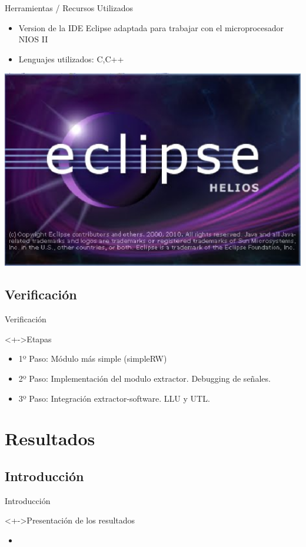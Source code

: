 \documentclass[xcolor=dvipsnames]{beamer}
\begin{document}
\begin{frame}{Herramientas / Recursos Utilizados}
\begin{block}
    \begin{itemize}
      \scriptsize
     	\item Version de la IDE Eclipse adaptada para trabajar con el microprocesador NIOS II
	\item Lenguajes utilizados: C,C++
    \end{itemize}
	\center	
	\includegraphics[scale=0.10]{figures/eclipse.eps}  	
  \end{block}
\end{frame}

\subsection{Verificación}
\begin{frame}{Verificación}
\begin{block}<+->{Etapas}   
    \begin{itemize}
      \scriptsize
     	\item 1º Paso: Módulo más simple (simpleRW)
     	\item 2º Paso: Implementación del modulo extractor. Debugging de señales.
     	\item 3º Paso: Integración extractor-software. LLU y UTL.
    \end{itemize}
  \end{block}
\end{frame}

\section{Resultados}
\subsection{Introducción}
\begin{frame}{Introducción}
  \begin{block}<+->{Presentación de los resultados}   
    \begin{itemize}
      \scriptsize
     	\item     	
    \end{itemize}
  \end{block}
\end{frame}
\end{document}
